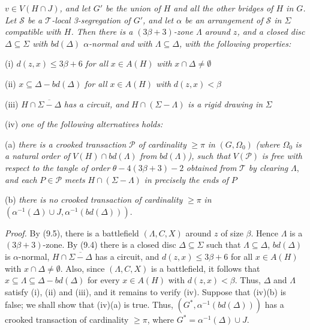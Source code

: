 \noindent \textit{$v \in V(H \cap J)$, and let $G'$ be the union of $H$ and all the other bridges of $H$ in $G$. Let $\mathscr{S}$ be a $\mathscr{T}$-local 3-segregation of $G'$, and let $\alpha$ be an arrangement of $\mathscr{S}$ in $\Sigma$ compatible with $H$. Then there is a $(3\beta + 3)$-zone $\Lambda$ around $z$, and a closed disc $\Delta \subseteq \Sigma$ with $bd(\Delta)$ $\alpha$-normal and with $\Lambda \subseteq \Delta$, with the following properties:}

\hspace*{12pt}(i) $d(z, x) \le 3\beta + 6$ \textit{for all} $x \in A(H)$ \textit{with} $x \cap \Delta \ne \emptyset$

\hspace*{12pt}(ii) $x \subseteq \Delta - bd(\Delta)$ \textit{for all} $x \in A(H)$ \textit{with} $d(z, x) < \beta$

\hspace*{12pt}(iii) $H \cap \overline{\Sigma - \Delta}$ \textit{has a circuit, and} $H \cap (\Sigma - \Lambda)$ \textit{is a rigid drawing in} $\Sigma$

\hspace*{12pt}(iv) \textit{one of the following alternatives holds:}

\hspace*{12pt}(a) \textit{there is a crooked transaction} $\mathscr{P}$ \textit{of cardinality} $\ge \pi$ \textit{in} $(G, \Omega_0)$ \textit{(where} $\Omega_0$ \textit{is a natural order of} $V(H) \cap bd(\Lambda)$ \textit{from} $bd(\Lambda)$\textit{), such that} $V(\mathscr{P})$ \textit{is free with respect to the tangle of order} $\theta - 4(3\beta + 3) - 2$ \textit{obtained from} $\mathscr{T}$ \textit{by clearing} $\Lambda$, \textit{and each} $P \in \mathscr{P}$ \textit{meets} $H \cap (\Sigma - \Lambda)$ \textit{in precisely the ends of} $P$

\hspace*{12pt}(b) \textit{there is no crooked transaction of cardinality} $\ge \pi$ \textit{in} $(\alpha^{-1}(\Delta) \cup J, \alpha^{-1}(bd(\Delta)))$.

\textit{Proof.} By (9.5), there is a battlefield $(\Lambda, C, X)$ around $z$ of size $\beta$. Hence $\Lambda$ is a $(3\beta + 3)$-zone. By (9.4) there is a closed disc $\Delta \subseteq \Sigma$ such that $\Lambda \subseteq \Delta$, $bd(\Delta)$ is $\alpha$-normal, $H \cap \overline{\Sigma - \Delta}$ has a circuit, and $d(z, x) \le 3\beta + 6$ for all $x \in A(H)$ with $x \cap \Delta \ne \emptyset$. Also, since $(\Lambda, C, X)$ is a battlefield, it follows that $x \subseteq \Lambda \subseteq \Delta - bd(\Delta)$ for every $x \in A(H)$ with $d(z, x) < \beta$. Thus, $\Delta$ and $\Lambda$ satisfy (i), (ii) and (iii), and it remains to verify (iv). Suppose that (iv)(b) is false; we shall show that (iv)(a) is true. Thus, $(G^*, \alpha^{-1}(bd(\Delta)))$ has a crooked transaction of cardinality $\ge \pi$, where $G^* = \alpha^{-1}(\Delta) \cup J$.

